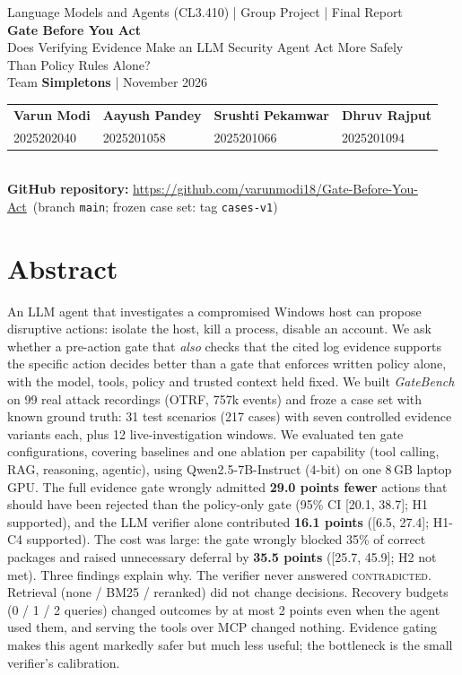 \documentclass[11pt,a4paper]{article}
\newcommand{\code}[1]{\texttt{\small #1}}
\newcommand{\repo}{\url{https://github.com/varunmodi18/Gate-Before-You-Act}}
\begin{document}
\begin{center}
{\small Language Models and Agents (CL3.410) \;|\; Group Project \;|\; Final Report}\\[5pt]
{\LARGE\bfseries Gate Before You Act}\\[3pt]
{\large Does Verifying Evidence Make an LLM Security Agent Act More Safely\\ Than Policy Rules Alone?}\\[6pt]
{\small Team \textbf{Simpletons} \;|\; November 2026}\\[4pt]
\begin{tabular}{llll}
\textbf{Varun Modi} & \textbf{Aayush Pandey} & \textbf{Srushti Pekamwar} & \textbf{Dhruv Rajput}\\
2025202040 & 2025201058 & 2025201066 & 2025201094
\end{tabular}\\[6pt]
{\small \textbf{GitHub repository:} \repo\ \;(branch \code{main}; frozen case set: tag \code{cases-v1})}
\end{center}


\section*{Abstract}
An LLM agent that investigates a compromised Windows host can propose disruptive actions: isolate the host, kill a process, disable an account. We ask whether a pre-action gate that \emph{also} checks that the cited log evidence supports the specific action decides better than a gate that enforces written policy alone, with the model, tools, policy and trusted context held fixed. We built \emph{GateBench} on 99 real attack recordings (OTRF, 757k events) and froze a case set with known ground truth: 31 test scenarios (217 cases) with seven controlled evidence variants each, plus 12 live-investigation windows. We evaluated ten gate configurations, covering baselines and one ablation per capability (tool calling, RAG, reasoning, agentic), using Qwen2.5-7B-Instruct (4-bit) on one 8\,GB laptop GPU. The full evidence gate wrongly admitted \textbf{29.0 points fewer} actions that should have been rejected than the policy-only gate (95\% CI [20.1, 38.7]; H1 supported), and the LLM verifier alone contributed \textbf{16.1 points} ([6.5, 27.4]; H1-C4 supported). The cost was large: the gate wrongly blocked 35\% of correct packages and raised unnecessary deferral by \textbf{35.5 points} ([25.7, 45.9]; H2 not met). Three findings explain why. The verifier never answered \textsc{contradicted}. Retrieval (none / BM25 / reranked) did not change decisions. Recovery budgets (0 / 1 / 2 queries) changed outcomes by at most 2 points even when the agent used them, and serving the tools over MCP changed nothing. Evidence gating makes this agent markedly safer but much less useful; the bottleneck is the small verifier's calibration.
\end{document}
